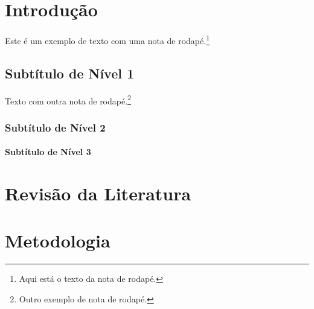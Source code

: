 \documentclass[12pt,a4paper,brazil]{abntex2}
\begin{document}
\begin{capa}
    \center
    \ABNTEXchapterfont\Large\textsc{\imprimirinstituicao}

    \vspace*{5cm}

    \ABNTEXchapterfont\bfseries\LARGE\imprimirtitulo

    \vspace*{3cm}

    \Large\imprimirautor

    \vfill

    \large\imprimirlocal

    \large\imprimirdata
\end{capa}

\imprimirfolhaderosto

\sumario %
\listoffigures   %
\listoftables    %

\textual

\chapter{Introdução}
Este é um exemplo de texto com uma nota de rodapé.\footnote{Aqui está o texto da nota de rodapé.} \lipsum[1]

\section{Subtítulo de Nível 1}
Texto com outra nota de rodapé.\footnote{Outro exemplo de nota de rodapé.} \lipsum[2-3]

\subsection{Subtítulo de Nível 2}
\lipsum[4]
\subsubsection{Subtítulo de Nível 3}
\lipsum[5]

\chapter{Revisão da Literatura}
\lipsum[6-7]

\chapter{Metodologia}
\lipsum[8-9]
\end{document}
